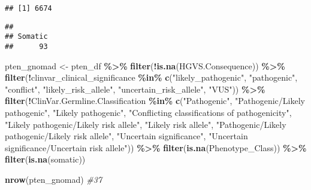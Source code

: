 \documentclass[
]{article}
\newenvironment{Shaded}{\begin{snugshade}}{\end{snugshade}}
\newcommand{\AttributeTok}[1]{\textcolor[rgb]{0.13,0.29,0.53}{#1}}
\newcommand{\CommentTok}[1]{\textcolor[rgb]{0.56,0.35,0.01}{\textit{#1}}}
\newcommand{\ConstantTok}[1]{\textcolor[rgb]{0.56,0.35,0.01}{#1}}
\newcommand{\FunctionTok}[1]{\textcolor[rgb]{0.13,0.29,0.53}{\textbf{#1}}}
\newcommand{\NormalTok}[1]{#1}
\newcommand{\OtherTok}[1]{\textcolor[rgb]{0.56,0.35,0.01}{#1}}
\newcommand{\SpecialCharTok}[1]{\textcolor[rgb]{0.81,0.36,0.00}{\textbf{#1}}}
\newcommand{\StringTok}[1]{\textcolor[rgb]{0.31,0.60,0.02}{#1}}
\begin{document}
\begin{verbatim}
## [1] 6674
\end{verbatim}

\begin{Shaded}
\end{Shaded}

\begin{verbatim}
## 
## Somatic 
##      93
\end{verbatim}

\begin{Shaded}
\begin{Highlighting}[]
\NormalTok{pten\_gnomad }\OtherTok{\textless{}{-}}\NormalTok{ pten\_df }\SpecialCharTok{\%\textgreater{}\%} \FunctionTok{filter}\NormalTok{(}\SpecialCharTok{!}\FunctionTok{is.na}\NormalTok{(HGVS.Consequence)) }\SpecialCharTok{\%\textgreater{}\%} 
  \FunctionTok{filter}\NormalTok{(}\SpecialCharTok{!}\NormalTok{clinvar\_clinical\_significance }\SpecialCharTok{\%in\%} \FunctionTok{c}\NormalTok{(}\StringTok{"likely\_pathogenic"}\NormalTok{, }\StringTok{"pathogenic"}\NormalTok{, }\StringTok{"conflict"}\NormalTok{, }\StringTok{"likely\_risk\_allele"}\NormalTok{, }\StringTok{"uncertain\_risk\_allele"}\NormalTok{, }\StringTok{"VUS"}\NormalTok{)) }\SpecialCharTok{\%\textgreater{}\%}
  \FunctionTok{filter}\NormalTok{(}\SpecialCharTok{!}\NormalTok{ClinVar.Germline.Classification }\SpecialCharTok{\%in\%} \FunctionTok{c}\NormalTok{(}\StringTok{"Pathogenic"}\NormalTok{, }\StringTok{"Pathogenic/Likely pathogenic"}\NormalTok{, }\StringTok{"Likely pathogenic"}\NormalTok{,}
                                                 \StringTok{"Conflicting classifications of pathogenicity"}\NormalTok{, }\StringTok{"Likely pathogenic/Likely risk allele"}\NormalTok{,}
                                                 \StringTok{"Likely risk allele"}\NormalTok{, }\StringTok{"Pathogenic/Likely pathogenic/Likely risk allele"}\NormalTok{,}
                                                 \StringTok{"Uncertain significance"}\NormalTok{, }\StringTok{"Uncertain significance/Uncertain risk allele"}\NormalTok{)) }\SpecialCharTok{\%\textgreater{}\%}
  \FunctionTok{filter}\NormalTok{(}\FunctionTok{is.na}\NormalTok{(Phenotype\_Class)) }\SpecialCharTok{\%\textgreater{}\%}
  \FunctionTok{filter}\NormalTok{(}\FunctionTok{is.na}\NormalTok{(somatic))}

\FunctionTok{nrow}\NormalTok{(pten\_gnomad) }\CommentTok{\#37}
\end{Highlighting}
\end{Shaded}
\end{document}
